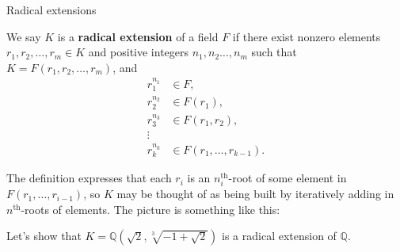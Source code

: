 \begin{section}{Radical extensions}
\begin{definition}
We say $K$ is a \textbf{radical extension} of a field $F$ if there exist nonzero elements $r_1,r_2,\ldots,r_m\in K$ and positive integers $n_1,n_2\ldots,n_m$ such that $K = F(r_1,r_2,\ldots,r_m)$, and 
\begin{align*}
 r_1^{n_1} &\in F,\\
 r_2^{n_2} &\in F(r_1),\\
 r_3^{n_3} &\in F(r_1,r_2),\\
 \vdots & \\
 r_k^{n_k} &\in F(r_1,\ldots,r_{k-1}).
\end{align*}
\end{definition}
The definition expresses that each $r_i$ is an $n_i^\text{th}$-root of some element in $F(r_1,\ldots,r_{i-1})$, so $K$ may be thought of as being built by iteratively adding in $n^\text{th}$-roots of elements. The picture is something like this:
\begin{center}
\end{center}

\begin{example}
Let's show that $K= \mathbb{Q}\left(\sqrt{2},\sqrt[3]{-1 + \sqrt{2}}\right)$ is a radical extension of $\mathbb{Q}$. 


\end{example}
\end{section}
